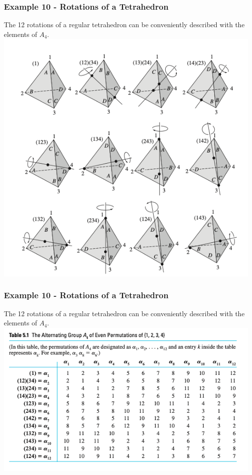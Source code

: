 \documentclass{beamer}
\begin{document}
\begin{frame}
    \frametitle{Example 10 - Rotations of a Tetrahedron}

    The 12 rotations of a regular tetrahedron can be conveniently described with the elements of \(A_4\). 
\includegraphics[scale=0.35]{Figures/fig_2.png}



\end{frame}

\begin{frame}
    \frametitle{Example 10 - Rotations of a Tetrahedron}

    The 12 rotations of a regular tetrahedron can be conveniently described with the elements of \(A_4\). 
\includegraphics[scale=0.5]{Figures/fig_3.png}



\end{frame}
\end{document}
